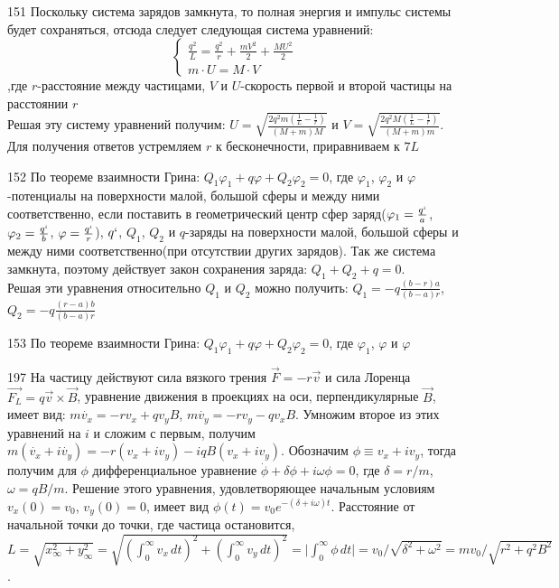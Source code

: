 \begin{Solution}{151}
Поскольку система зарядов замкнута, то полная энергия и импульс системы будет сохраняться, отсюда следует следующая система уравнений:
\begin{equation*}
\begin{cases}
\frac{q^2}{L}=\frac{q^2}{r}+\frac{m V^2}{2}+\frac{M U^2}{2} \\
m \cdot U=M \cdot V
\end{cases}
\end{equation*}
,где $r$-расстояние между частицами, $V$ и $U$-скорость первой и второй частицы на расстоянии $r$ \\
Решая эту систему уравнений получим: $U=\sqrt{\frac{2 q^2 m (\frac{1}{L}-\frac{1}{r})}{(M+m) M}}$ и $V=\sqrt{\frac{2 q^2 M (\frac{1}{L}-\frac{1}{r})}{(M+m)m}}$. Для получения ответов устремляем $r$ к бесконечности, приравниваем к $7L$
\end{Solution}
\begin{Solution}{152}
По теореме взаимности Грина: $Q_1\varphi_1+q\varphi+Q_2\varphi_2=0$, где $\varphi_1$, $\varphi_2$ и $\varphi$-потенциалы на поверхности малой, большой сферы и между ними соответственно, если поставить в геометрический центр сфер заряд($\varphi_1=\frac{q`}{a}$, $\varphi_2=\frac{q`}{b}$, $\varphi=\frac{q`}{r}$), $q`$, $Q_1$, $Q_2$ и $q$-заряды на поверхности малой, большой сферы и между ними соответственно(при отсутствии других зарядов). Так же система замкнута, поэтому действует закон сохранения заряда: $Q_1+Q_2+q=0$.\\
Решая эти уравнения относительно $Q_1$ и $Q_2$ можно получить: $Q_1=-q\frac{(b-r)a}{(b-a)r}$, $Q_2=-q\frac{(r-a)b}{(b-a)r}$
\end{Solution}
\begin{Solution}{153}
По теореме взаимности Грина: $Q_1\varphi_1+q\varphi+Q_2\varphi_2=0$, где $\varphi_1$, $\varphi$ и $\varphi$
\end{Solution}
\begin{Solution}{197}
На частицу действуют сила вязкого трения $\vec{F} = - r\vec{v}$ и сила Лоренца $\vec{F_L} = q \vec{v} \times \vec{B}$, уравнение движения в проекциях на оси, перпендикулярные $\vec{B}$, имеет вид:  $m \dot{v_x}=-rv_x+q v_y B$, $m \dot{v_y}=-rv_y-q v_x B$. Умножим второе из этих уравнений на $i$ и сложим с первым, получим $m\left( \dot{v_x} +i \dot{v_y} \right) = -r(v_x+i v_y) - iqB(v_x+i v_y)$. Обозначим $\phi \equiv v_x+i v_y$, тогда получим для $\phi$ дифференциальное уравнение $\dot{\phi} + \delta \phi + i\omega \phi=0$, где $\delta=r/m$,  $\omega=qB/m$. Решение этого уравнения, удовлетворяющее начальным условиям $v_x(0)=v_0$, $v_y(0)=0$, имеет вид $\phi(t)=v_0 e^{-(\delta +i\omega) t}$. Расстояние от начальной точки до точки, где частица остановится, $L=\sqrt{x_{\infty}^2 + y_{\infty}^2} =\sqrt{ \left( \int_{0}^{\infty}{v_x \, dt} \right)^2 + \left( \int_{0}^{\infty}{v_y \, dt} \right)^2}=\vert \int_{0}^{\infty}{ \phi \, dt} \vert=v_0/\sqrt{\delta^2 +\omega^2}=m v_0/\sqrt{r^2+q^2B^2}$.
\end{Solution}
